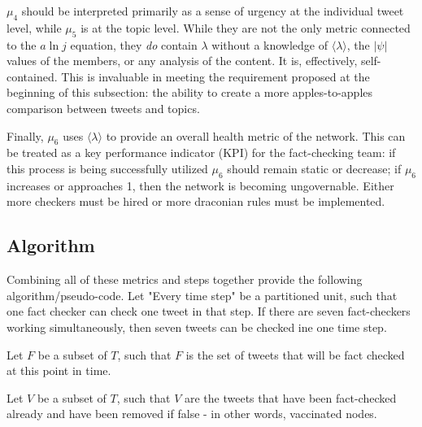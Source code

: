 \documentclass[preprint,review,12pt]{elsarticle}
\begin{document}
$\mu_4$ should be interpreted primarily as a sense of urgency at the individual tweet level, while $\mu_5$ is at the topic level. While they are not the only metric connected to the $a \ln j$ equation, they \textit{do} contain $\lambda$ without a knowledge of $\langle \lambda \rangle$, the $|\psi|$ values of the members, or any analysis of the content. It is, effectively, self-contained. This is invaluable in meeting the requirement proposed at the beginning of this subsection: the ability to create a more apples-to-apples comparison between tweets and topics. 

Finally, $\mu_6$ uses $\langle \lambda \rangle$ to provide an overall health metric of the network. This can be treated as a key performance indicator (KPI) for the fact-checking team: if this process is being successfully utilized $\mu_6$ should remain static or decrease; if $\mu_6$ increases or approaches 1, then the network is becoming ungovernable. Either more checkers must be hired or more draconian rules must be implemented.

\subsection{Algorithm}
Combining all of these metrics and steps together provide the following algorithm/pseudo-code. Let "Every time step" be a partitioned unit, such that one fact checker can check one tweet in that step. If there are seven fact-checkers working simultaneously, then seven tweets can be checked ine one time step.

Let $F$ be a subset of $T$, such that $F$ is the set of tweets that will be fact checked at this point in time.

Let $V$ be a subset of $T$, such that $V$ are the tweets that have been fact-checked already and have been removed if false - in other words, vaccinated nodes.
\end{document}
